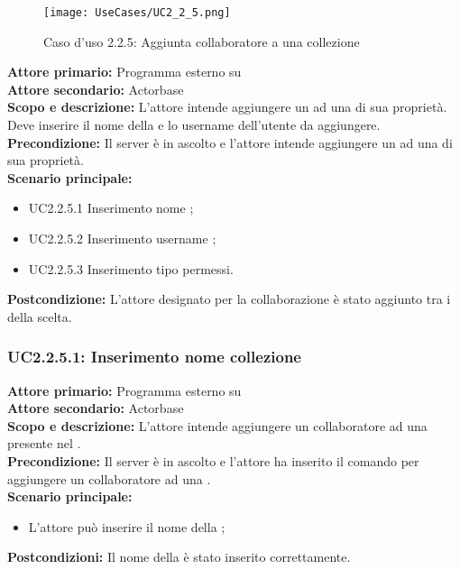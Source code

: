 \documentclass{scalatekids-article}
\begin{document}
\begin{figure}[H]
  \begin{center}
    \texttt{[image: UseCases/UC2\_2\_5.png]}
    \caption{Caso d'uso 2.2.5: Aggiunta collaboratore a una collezione}
  \end{center}
\end{figure}
\textbf{Attore primario:} Programma esterno su \\
\textbf{Attore secondario:} Actorbase\\
\textbf{Scopo e descrizione:} L'attore intende aggiungere un  ad una  di sua proprietà. Deve inserire il nome della  e lo username dell'utente da aggiungere.\\
\textbf{Precondizione:} Il server è in ascolto e l'attore intende aggiungere un  ad una  di sua proprietà.\\
\textbf{Scenario principale:}
\begin{itemize}
\item UC2.2.5.1 Inserimento nome ;
\item UC2.2.5.2 Inserimento username ;
\item UC2.2.5.3 Inserimento tipo permessi.
\end{itemize}
\textbf{Postcondizione:} L'attore designato per la collaborazione è stato aggiunto tra i  della  scelta.

\subsubsection{UC2.2.5.1: Inserimento nome collezione}

\textbf{Attore primario:} Programma esterno su \\
\textbf{Attore secondario:} Actorbase\\
\textbf{Scopo e descrizione:} L’attore intende aggiungere un collaboratore ad una  presente nel .\\
\textbf{Precondizione:} Il server è in ascolto e l’attore ha inserito il comando per aggiungere un collaboratore ad una .\\
\textbf{Scenario principale:}
\begin{itemize}
\item L'attore può inserire il nome della ;
\end{itemize}
\textbf{Postcondizioni:} Il nome della  è stato inserito correttamente.
\end{document}
